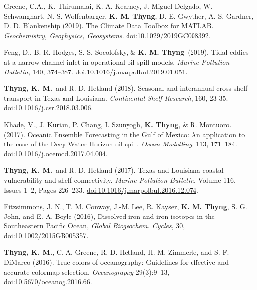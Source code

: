 \documentclass[10pt,letterpaper]{article}
\newcommand{\kmt}{\textbf{K. M. Thyng}}
\newcommand{\tkm}{\textbf{Thyng, K. M.}}
\newcommand{\kt}{\textbf{K. Thyng}}
\renewenvironment{itemize}{
  \begin{list}{}{
    \setlength{\leftmargin}{1.5em}
    \setlength{\itemsep}{0.25em}
    \setlength{\parskip}{0pt}
    \setlength{\parsep}{0.25em}
  }
}{
  \end{list}
}
\begin{document}
\begin{itemize}
\item Greene, C.A.,  K. Thirumalai,  K. A. Kearney,  J. Miguel Delgado,  W. Schwanghart,  N. S. Wolfenbarger,  \kmt,  D. E. Gwyther,  A. S. Gardner,  D. D. Blankenship (2019). The Climate Data Toolbox for MATLAB.  \textit{Geochemistry, Geophysics, Geosystems}. \href{https://agupubs.onlinelibrary.wiley.com/doi/abs/10.1029/2019GC008392}{doi:10.1029/2019GC008392}.

\item Feng, D., B. R. Hodges, S. S. Socolofsky, \& \kmt~(2019). Tidal eddies at a narrow channel inlet in operational oil spill models.  \textit{Marine Pollution Bulletin}, 140, 374--387. \href{https://www.sciencedirect.com/science/article/pii/S0025326X19300712?via%3Dihub}{doi:10.1016/j.marpolbul.2019.01.051}.

\item \tkm~and R. D. Hetland (2018). Seasonal and interannual cross-shelf transport in Texas and Louisiana. \textit{Continental Shelf Research}, 160, 23-35. \href{https://www.sciencedirect.com/science/article/pii/S0278434317302509}{doi:10.1016/j.csr.2018.03.006}.

\item Khade, V., J. Kurian, P. Chang, I. Szunyogh, \kt, \& R. Montuoro. (2017). Oceanic Ensemble Forecasting in the Gulf of Mexico: An application to the case of the Deep Water Horizon oil spill. \textit{Ocean Modelling}, 113, 171--184.  \href{http://www.sciencedirect.com/science/article/pii/S1463500317300525}{doi:10.1016/j.ocemod.2017.04.004}.

\item \tkm~and R. D. Hetland (2017). Texas and Louisiana coastal vulnerability and shelf connectivity. \textit{Marine Pollution Bulletin}, Volume 116, Issues 1--2, Pages 226--233. \href{http://www.sciencedirect.com/science/article/pii/S0025326X16310773}{doi:10.1016/j.marpolbul.2016.12.074}.

\item Fitzsimmons, J. N., T. M. Conway, J.-M. Lee, R. Kayser, \kmt, S. G. John, and E. A. Boyle (2016), Dissolved iron and iron isotopes in the Southeastern Pacific Ocean, \textit{Global Biogeochem. Cycles}, 30,\\ \href{http://onlinelibrary.wiley.com/doi/10.1002/2015GB005357/full}{doi:10.1002/2015GB005357}.

\item \tkm, C. A. Greene, R. D. Hetland, H. M. Zimmerle, and S. F. DiMarco (2016). True colors of oceanography: Guidelines for effective and accurate colormap selection. \textit{Oceanography} 29(3):9--13,\\ \href{http://tos.org/oceanography/assets/docs/29-3_thyng.pdf}{doi:10.5670/oceanog.2016.66}.


\end{itemize}
\end{document}
